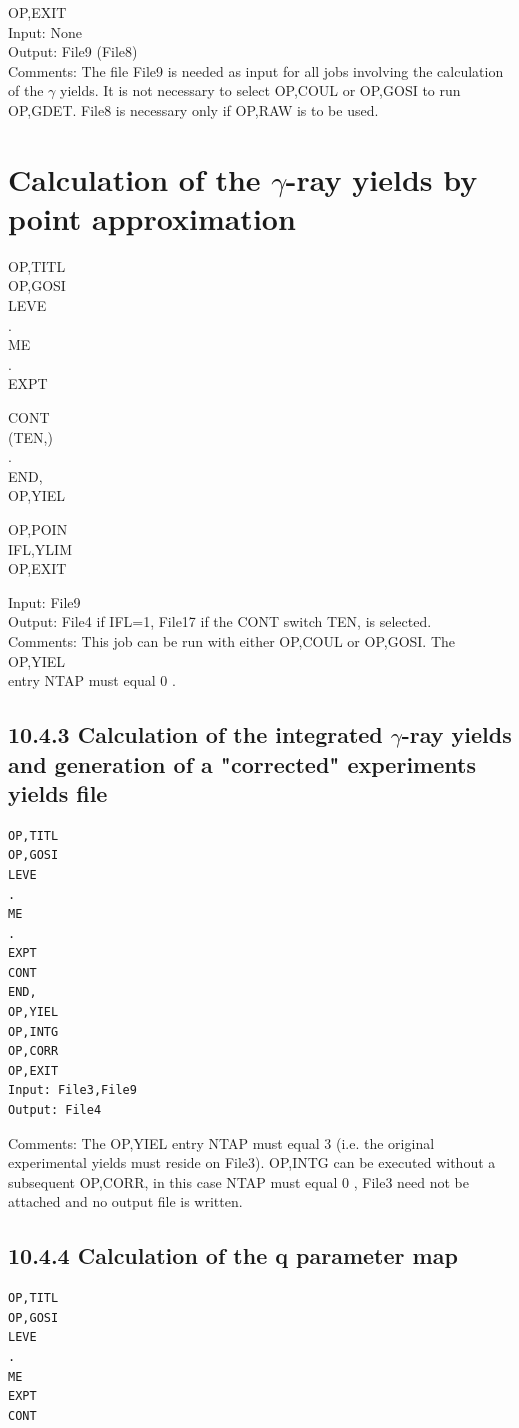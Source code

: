 \documentclass[10pt]{article}
\begin{document}
OP,EXIT\\
Input: None\\
Output: File9 (File8)\\
Comments: The file File9 is needed as input for all jobs involving the calculation of the $\gamma$ yields. It is not necessary to select OP,COUL or OP,GOSI to run OP,GDET. File8 is necessary only if OP,RAW is to be used.

\section*{Calculation of the $\gamma$-ray yields by point approximation}
OP,TITL\\
OP,GOSI\\
LEVE\\
.\\
ME\\
.\\
EXPT

CONT\\
(TEN,)\\
.\\
END,\\
OP,YIEL

OP,POIN\\
IFL,YLIM\\
OP,EXIT

Input: File9\\
Output: File4 if IFL=1, File17 if the CONT switch TEN, is selected.\\
Comments: This job can be run with either OP,COUL or OP,GOSI. The OP,YIEL\\
entry NTAP must equal 0 .

\subsection*{10.4.3 Calculation of the integrated $\gamma$-ray yields and generation of a "corrected" experiments yields file}
\begin{verbatim}
OP,TITL
OP,GOSI
LEVE
.
ME
.
EXPT
CONT
END,
OP,YIEL
OP,INTG
OP,CORR
OP,EXIT
Input: File3,File9
Output: File4
\end{verbatim}

Comments: The OP,YIEL entry NTAP must equal 3 (i.e. the original experimental yields must reside on File3). OP,INTG can be executed without a subsequent OP,CORR, in this case NTAP must equal 0 , File3 need not be attached and no output file is written.

\subsection*{10.4.4 Calculation of the q parameter map}
\begin{verbatim}
OP,TITL
OP,GOSI
LEVE
.
ME
EXPT
CONT
\end{verbatim}
\end{document}
